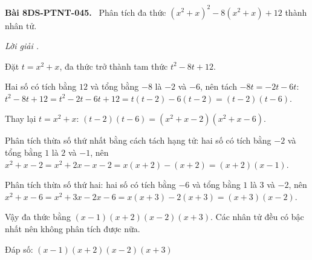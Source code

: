 \documentclass[12pt,a4paper]{article}
\newenvironment{problem}[1][]{\par\medskip\noindent\textbf{Bài #1.}\ }{\par}
\newenvironment{solution}[1][]{\par\noindent\textit{Lời giải #1.}\par}{\par}
\begin{document}
\begin{problem}[8DS-PTNT-045]
Phân tích đa thức $(x^2 + x)^2 - 8(x^2 + x) + 12$ thành nhân tử.

\begin{solution}
Đặt $t = x^2 + x$, đa thức trở thành tam thức $t^2 - 8t + 12$.

Hai số có tích bằng $12$ và tổng bằng $-8$ là $-2$ và $-6$, nên tách $-8t = -2t - 6t$: $t^2 - 8t + 12 = t^2 - 2t - 6t + 12 = t(t - 2) - 6(t - 2) = (t - 2)(t - 6)$.

Thay lại $t = x^2 + x$: $(t - 2)(t - 6) = (x^2 + x - 2)(x^2 + x - 6)$.

Phân tích thừa số thứ nhất bằng cách tách hạng tử: hai số có tích bằng $-2$ và tổng bằng $1$ là $2$ và $-1$, nên $x^2 + x - 2 = x^2 + 2x - x - 2 = x(x + 2) - (x + 2) = (x + 2)(x - 1)$.

Phân tích thừa số thứ hai: hai số có tích bằng $-6$ và tổng bằng $1$ là $3$ và $-2$, nên $x^2 + x - 6 = x^2 + 3x - 2x - 6 = x(x + 3) - 2(x + 3) = (x + 3)(x - 2)$.

Vậy đa thức bằng $(x - 1)(x + 2)(x - 2)(x + 3)$. Các nhân tử đều có bậc nhất nên không phân tích được nữa.

Đáp số: $\boxed{(x - 1)(x + 2)(x - 2)(x + 3)}$
\end{solution}
\end{problem}
\end{document}

